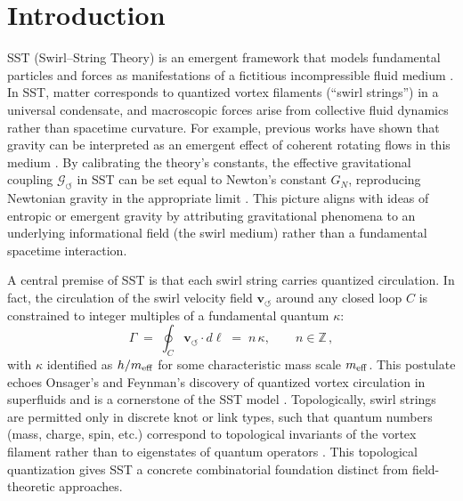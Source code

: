 \documentclass[12pt]{article}
\begin{document}
\section{Introduction}
    SST (Swirl--String Theory) is an emergent framework that models fundamental particles and forces as manifestations of a fictitious incompressible fluid medium \cite{Iskandarani2025Canon}. In SST, matter corresponds to quantized vortex filaments (``swirl strings'') in a universal condensate, and macroscopic forces arise from collective fluid dynamics rather than spacetime curvature. For example, previous works have shown that gravity can be interpreted as an emergent effect of coherent rotating flows in this medium \cite{Iskandarani2025RotatingFrame}. By calibrating the theory's constants, the effective gravitational coupling $\mathcal{G}_{\!\boldsymbol{\circlearrowleft}}$ in SST can be set equal to Newton's constant $G_{N}$, reproducing Newtonian gravity in the appropriate limit \cite{Iskandarani2025Canon}. This picture aligns with ideas of entropic or emergent gravity \cite{Verlinde2011,Verlinde2017,Jacobson1995,Padmanabhan2010} by attributing gravitational phenomena to an underlying informational field (the swirl medium) rather than a fundamental spacetime interaction.

    A central premise of SST is that each swirl string carries quantized circulation. In fact, the circulation of the swirl velocity field $\mathbf{v}_{\!\boldsymbol{\circlearrowleft}}$ around any closed loop $C$ is constrained to integer multiples of a fundamental quantum $\kappa$:
    \begin{equation}\label{eq:circulation}
    \Gamma \;=\; \oint_C \mathbf{v}_{\!\boldsymbol{\circlearrowleft}}\cdot d\boldsymbol{\ell} \;=\; n\,\kappa, \qquad n \in \mathbb{Z}\,,
    \end{equation}
    with $\kappa$ identified as $h/m_{\rm eff}$ for some characteristic mass scale $m_{\rm eff}$. This postulate echoes Onsager's and Feynman's discovery of quantized vortex circulation in superfluids and is a cornerstone of the SST model \cite{Onsager1949,Feynman1955}. Topologically, swirl strings are permitted only in discrete knot or link types, such that quantum numbers (mass, charge, spin, etc.) correspond to topological invariants of the vortex filament rather than to eigenstates of quantum operators \cite{Iskandarani2025Canon}. This topological quantization gives SST a concrete combinatorial foundation distinct from field-theoretic approaches.
\end{document}
